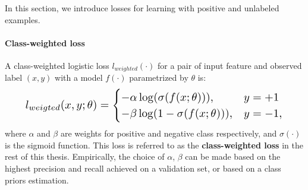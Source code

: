 
In this section, we introduce losses for learning with positive and unlabeled examples.

\paragraph{Class-weighted loss}

A class-weighted logistic loss $l_{weighted}(\cdot)$ for a pair of input feature and observed label $(x, y)$ with a model $f(\cdot)$ parametrized by $\theta$ is:
\begin{eqnarray}
\resizebox{0.9\columnwidth}{!}{$
l_{weigted}(x, y; \theta) =
  \begin{cases}
    - \alpha \log (\sigma(f(x; \theta))) , & y = +1 \\
    - \beta \log (1 - \sigma(f(x; \theta))), & y = -1,
  \end{cases}
$}
\end{eqnarray}
where $\alpha$ and $\beta$ are weights for positive and negative class respectively, and $\sigma(\cdot)$ is the sigmoid function.
This loss is referred to as the \textbf{class-weighted loss} in the rest of this thesis.
Empirically, the choice of $\alpha$, $\beta$ can be made based on the highest precision and recall achieved on a validation set, or based on a class priors estimation\cite{du2014class}.


